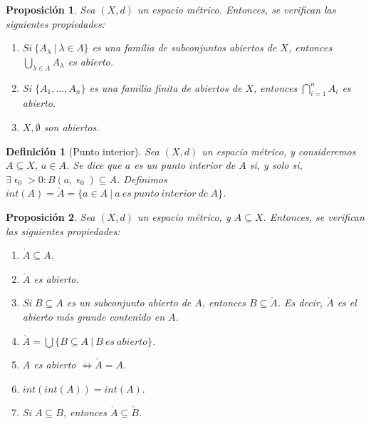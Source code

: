 \documentclass[11pt, a4paper, titlepage]{article}
\let\epsilon\upvarepsilon
\theoremstyle{theorem-style}
\newtheorem*{nprop}{Proposición}
\theoremstyle{definition-style}
\newtheorem*{ndef}{Definición}
\theoremstyle{remark-style}
\theoremstyle{example-style}
\newenvironment{nlist}
{\begin{enumerate}
\renewcommand\labelenumi{(\emph{\roman{enumi})}}}
{\end{enumerate}}
\begin{document}
\begin{nprop}
Sea $(X,d)$ un espacio métrico. Entonces, se verifican las siguientes propiedades:

\begin{nlist}
\item $Si\ \{A_\lambda \ | \ \lambda \in \Lambda \}$ es una familia de subconjuntos abiertos de $X$, entonces $\displaystyle \bigcup_{\lambda \in \Lambda} A_\lambda$ es abierto.

\item Si $\{A_1,\dots, A_n\}$ es una familia finita de abiertos de $X$, entonces $\displaystyle \bigcap_{i=1}^n A_i$ es abierto.

\item $X,\emptyset$ son abiertos.
\end{nlist}

\end{nprop}



\begin{ndef}[Punto interior]
Sea $(X,d)$ un espacio métrico, y consideremos $A\subseteq X$, $a\in A$. Se dice que $a$ \emph{es un punto interior de} $A$ si, y solo si, $\exists \epsilon_0 > 0: B(a,\epsilon_0)\subseteq A$.  Definimos $int(A) = \mathring{A} = \{ a\in A \ | \ a\ es\ punto\ interior\ de\ A\}$.
\end{ndef}



\begin{nprop}
Sea $(X,d)$ un espacio métrico, y $A\subseteq X$. Entonces, se verifican las siguientes propiedades:

\begin{nlist}
\item $\mathring{A} \subseteq A$.

\item $\mathring{A}$ es abierto.

\item Si $B\subseteq A$ es un subconjunto abierto de $A$, entonces $B \subseteq \mathring{A}$. Es decir, $\mathring{A}$ es el abierto más grande contenido en $A$.

\item $\displaystyle \mathring{A}  = \bigcup \{ B\subseteq A \ | \ B\ es\ abierto \}$.

\item $A$ es abierto $\iff \mathring{A} =A$.

\item $int(int(A)) = int(A).$

\item Si $A\subseteq B$, entonces $\mathring{A} \subseteq \mathring{B}$.
\end{nlist}

\end{nprop}
\end{document}
